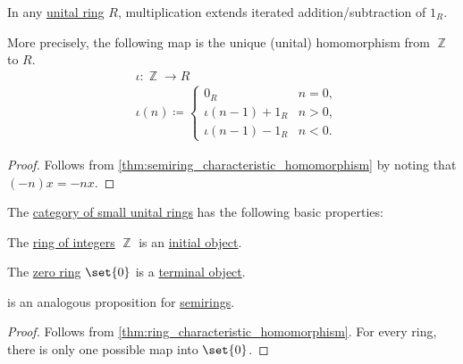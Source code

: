 \begin{proposition}\label{thm:ring_characteristic_homomorphism}
  In any \hyperref[def:ring]{unital ring} \( R \), multiplication extends iterated addition/subtraction of \( 1_R \).

  More precisely, the following map is the unique (unital) homomorphism from \( \BbbZ \) to \( R \).
  \begin{equation}\label{eq:thm:ring_characteristic_homomorphism}
    \begin{aligned}
      &\iota: \BbbZ \to R \\
      &\iota(n) \coloneqq \begin{cases}
        0_R                &n = 0, \\
        \iota(n - 1) + 1_R &n > 0, \\
        \iota(n - 1) - 1_R &n < 0.
      \end{cases}
    \end{aligned}
  \end{equation}
\end{proposition}
\begin{proof}
  Follows from \cref{thm:semiring_characteristic_homomorphism} by noting that \( (-n)x = -nx \).
\end{proof}

\begin{proposition}\label{thm:category_of_rings_properties}
  The \hyperref[def:ring/category]{category of small unital rings} has the following basic properties:
  \begin{thmenum}
     The \hyperref[def:integers]{ring of integers} \( \BbbZ \) is an \hyperref[def:universal_objects/initial]{initial object}.

     The \hyperref[def:ring/trivial]{zero ring} \( \set{ 0 } \) is a \hyperref[def:universal_objects/terminal]{terminal object}.
  \end{thmenum}
\end{proposition}
\begin{comments}
  \item {} is an analogous proposition for \hyperref[def:semiring]{semirings}.
\end{comments}
\begin{proof}
   Follows from \cref{thm:ring_characteristic_homomorphism}.
   For every ring, there is only one possible map into \( \set{ 0 } \).
\end{proof}

